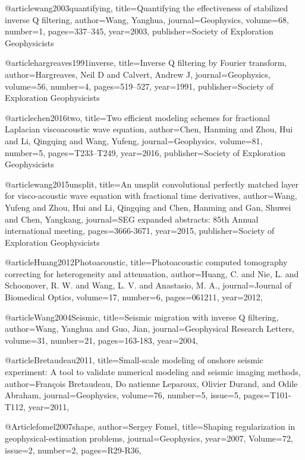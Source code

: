 {@article{wang2003quantifying,
  title={Quantifying the effectiveness of stabilized inverse {Q} filtering},
  author={Wang, Yanghua},
  journal={Geophysics},
  volume={68},
  number={1},
  pages={337--345},
  year={2003},
  publisher={Society of Exploration Geophysicists}
}

@article{hargreaves1991inverse,
  title={Inverse {Q} filtering by Fourier transform},
  author={Hargreaves, Neil D and Calvert, Andrew J},
  journal={Geophysics},
  volume={56},
  number={4},
  pages={519--527},
  year={1991},
  publisher={Society of Exploration Geophysicists}
}

@article{chen2016two,
  title={Two efficient modeling schemes for fractional {L}aplacian viscoacoustic wave equation},
  author={Chen, Hanming and Zhou, Hui and Li, Qingqing and Wang, Yufeng},
  journal={Geophysics},
  volume={81},
  number={5},
  pages={T233--T249},
  year={2016},
  publisher={Society of Exploration Geophysicists}
}

@article{wang2015unsplit,
  title={An unsplit convolutional perfectly matched layer for visco-acoustic wave equation with fractional time derivatives},
  author={Wang, Yufeng and Zhou, Hui and Li, Qingqing and Chen, Hanming and Gan, Shuwei and Chen, Yangkang},
  journal={SEG expanded abstracts: 85th Annual international meeting},
  pages={3666-3671},
  year={2015},
  publisher={Society of Exploration Geophysicists}
}

@article{Huang2012Photoacoustic,
  title={Photoacoustic computed tomography correcting for heterogeneity and attenuation},
  author={Huang, C. and Nie, L. and Schoonover, R. W. and Wang, L. V. and Anastasio, M. A.},
  journal={Journal of Biomedical Optics},
  volume={17},
  number={6},
  pages={061211},
  year={2012},
}

@article{Wang2004Seismic,
  title={Seismic migration with inverse {Q} filtering},
  author={Wang, Yanghua and Guo, Jian},
  journal={Geophysical Research Letters},
  volume={31},
  number={21},
  pages={163-183},
  year={2004},
}

@article{Bretaudeau2011,
  title={Small-scale modeling of onshore seismic experiment: A tool to validate numerical modeling and seismic imaging methods},
  author={François Bretaudeau, Do natienne Leparoux, Olivier Durand, and Odile Abraham},
  journal={Geophysics},
  volume={76},
  number={5},
  issue=5,
  pages={T101-T112},
  year={2011},
}

@Article{fomel2007shape,
  author={Sergey Fomel},
  title={Shaping regularization in geophysical-estimation problems},
  journal={Geophysics},
  year=2007,
  Volume=72,
  issue=2,
  number=2,
  pages={R29-R36},
}

}
